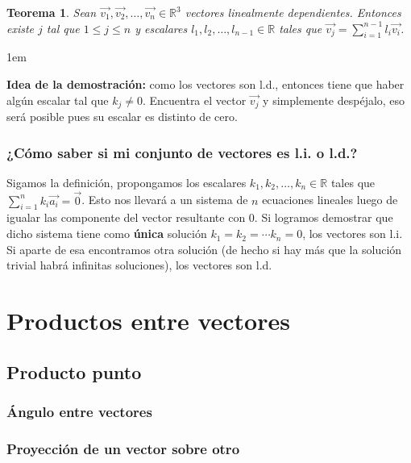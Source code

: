 \documentclass[12pt, fleqn]{report}                             %
\newenvironment{SmallIndentation}[1][0.75em]                    %
    {\begin{adjustwidth}{#1}{}\begin{footnotesize}}                 %
    {\end{footnotesize}\end{adjustwidth}}                           %
\newtheorem{Theorem}{Teorema}[section]                          %
\newcommand{\ve}[1]{\vec{#1}}									%
\begin{document}
			\begin{Theorem}
				Sean $\ve{v_1}, \ve{v_2}, \ldots, \ve{v_n} \in \mathbb{R}^3$ vectores linealmente dependientes. Entonces existe $j$ tal que $1 \leq j \leq n$ y escalares $l_1, l_2, \ldots, l_{n-1} \in \mathbb{R}$ tales que $\ve{v_j} = \displaystyle \sum_{i=1}^{n-1} l_i \ve{v_i}$.
			\end{Theorem}
		
			\begin{SmallIndentation}[1em]
				\textbf{Idea de la demostración:} como los vectores son l.d., entonces tiene que haber algún escalar tal que $k_j \neq 0$. Encuentra el vector $\ve{v_j}$ y simplemente despéjalo, eso será posible pues su escalar es distinto de cero.
			\end{SmallIndentation}
			
			\subsubsection{¿Cómo saber si mi conjunto de vectores es l.i. o l.d.?}
			
			Sigamos la definición, propongamos los escalares $k_1, k_2, \ldots, k_n \in \mathbb{R}$ tales que $\displaystyle \sum_{i=1}^{n} k_i \ve{a_i} = \ve{0}$. Esto nos llevará a un sistema de $n$ ecuaciones lineales luego de igualar las componente del vector resultante con 0. Si logramos demostrar que dicho sistema tiene como \textbf{única} solución $k_1 = k_2 = \cdots k_n = 0$, los vectores son l.i. Si aparte de esa encontramos otra solución (de hecho si hay más que la solución trivial habrá infinitas soluciones), los vectores son l.d.
			
		\section{Productos entre vectores}
		
			\subsection{Producto punto}
			
				\subsubsection{Ángulo entre vectores}
				
				\subsubsection{Proyección de un vector sobre otro}
				
\end{document}
